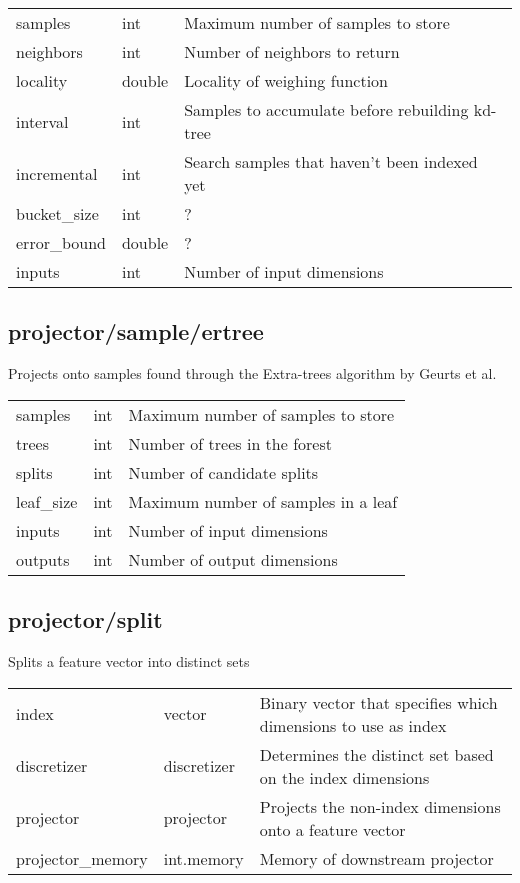 \noindent\begin{tabular}{@{}lll@{}}
samples&int&Maximum number of samples to store\\
neighbors&int&Number of neighbors to return\\
locality&double&Locality of weighing function\\
interval&int&Samples to accumulate before rebuilding kd-tree\\
incremental&int&Search samples that haven't been indexed yet\\
bucket\_size&int&?\\
error\_bound&double&?\\
inputs&int&Number of input dimensions\\
\end{tabular}
\subsection{projector/sample/ertree}
\noindent Projects onto samples found through the Extra-trees algorithm by Geurts et al.\\

\noindent\begin{tabular}{@{}lll@{}}
samples&int&Maximum number of samples to store\\
trees&int&Number of trees in the forest\\
splits&int&Number of candidate splits\\
leaf\_size&int&Maximum number of samples in a leaf\\
inputs&int&Number of input dimensions\\
outputs&int&Number of output dimensions\\
\end{tabular}
\subsection{projector/split}
\noindent Splits a feature vector into distinct sets\\

\noindent\begin{tabular}{@{}lll@{}}
index&vector&Binary vector that specifies which dimensions to use as index\\
discretizer&discretizer&Determines the distinct set based on the index dimensions\\
projector&projector&Projects the non-index dimensions onto a feature vector\\
projector\_memory&int.memory&Memory of downstream projector\\
\end{tabular}
\\

